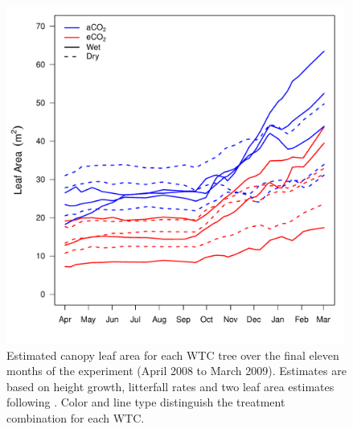 \documentclass[a4paper]{article}\usepackage[]{graphicx}\usepackage[]{color}
\begin{document}
\begin{figure}[h!]
    \centering
    \includegraphics[width=0.99\textwidth]{leafarea.pdf}
    \caption{Estimated canopy leaf area for each WTC tree over the final eleven months of the experiment (April 2008 to March 2009). Estimates are based on height growth, litterfall rates and two leaf area estimates following \citet{barton2012effects}. Color and line type distinguish the treatment combination for each WTC.}
    \label{fig:figure 4.3}
\end{figure}
\end{document}
